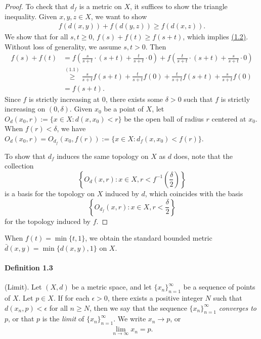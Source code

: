 \documentclass{article}
\begin{document}
\begin{itemize}
    \begin{proof}
    To check that $d_f$ is a metric on $X$, it suffices to show the triangle inequality. Given $x,y,z\in X$, we want to show
    \begin{align*}
    	f(d(x,y)) + f(d(y,z)) \geq f(d(x,z)).\tag{1.2}\label{eq:1.2}
    \end{align*}
    We show that for all $s,t\geq 0$, $f(s)+f(t)\geq f(s+t)$, which implies \hyperref[eq:1.2]{(1.2)}. Without loss of generality, we assume $s,t >0$. Then
    \begin{align*}
    	f(s) + f(t) &= f\left(\frac{s}{s+t}\cdot(s+t) + \frac{t}{s+t}\cdot 0\right) + f\left(\frac{t}{s+t}\cdot(s+t) + \frac{s}{s+t}\cdot 0\right)\\
    	&\overset{\hyperref[eq:1.1]{(1.1)}}{\geq} \frac{s}{s+t}f(s+t) + \frac{t}{s+t}f(0) + \frac{t}{s+t}f(s+t) + \frac{s}{s+t}f(0)\\
    	&= f(s+t).
    \end{align*}
    Since $f$ is strictly increasing at $0$, there exists some $\delta > 0$ such that $f$ is strictly increasing on $(0,\delta)$. Given $x_0$ be a point of $X$, let $O_d(x_0,r):=\{x\in X:d(x,x_0) < r\}$ be the open ball of radius $r$ centered at $x_0$. When $f(r)<\delta$, we have $O_d(x_0,r)=O_{d_f}(x_0,f(r)):=\{x\in X:d_f(x,x_0) < f(r)\}$.
    
    To show that $d_f$ induces the same topology on $X$ as $d$ does, note that the collection 
    $$\left\{O_d(x,r):x\in X,r<f^{-1}\left(\frac{\delta}{2}\right)\right\}$$
    is a basis for the topology on $X$ induced by $d$, which coincides with the basis 
    $$\left\{O_{d_f}(x,r):x\in X,r<\frac{\delta}{2}\right\}$$
    for the topology induced by $f$.
    \end{proof}
    When $f(t)=\min\{t,1\}$, we obtain the standard bounded metric $\bar{d}(x,y)=\min\{d(x,y),1\}$ on $X$.
\end{itemize} 

\paragraph{Definition 1.3\label{def:1.3}} (Limit). Let $(X,d)$ be a metric space, and let $\{x_n\}_{n=1}^\infty$ be a sequence of points of $X$. Let $p\in X$. If for each $\epsilon > 0$, there exists a positive integer $N$ such that $d(x_n,p)<\epsilon$ for all $n\geq N$, then we say that the sequence $\{x_n\}_{n=1}^\infty$ \textit{converges to} $p$, or that $p$ is the \textit{limit} of $\{x_n\}_{n=1}^\infty$. We write $x_n\to p$, or
\begin{align*}
	\lim_{n\to\infty} x_n=p.
\end{align*}
\end{document}
